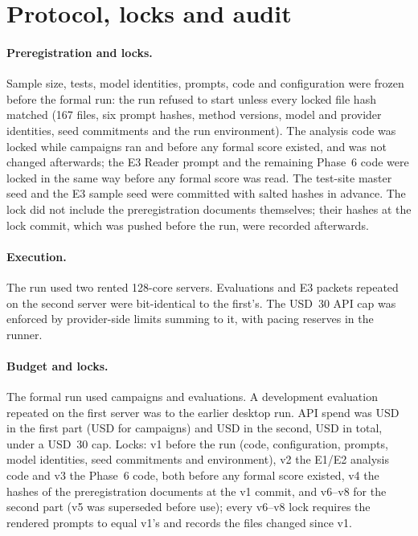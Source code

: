 \section{Protocol, locks and audit}
\label{app:protocol}
\paragraph{Preregistration and locks.} Sample size, tests, model identities, prompts, code and configuration were frozen before the formal run: the run refused to start unless every locked file hash matched (167 files, six prompt hashes, method versions, model and provider identities, seed commitments and the run environment). The analysis code was locked while campaigns ran and before any formal score existed, and was not changed afterwards; the E3 Reader prompt and the remaining Phase~6 code were locked in the same way before any formal score was read. The test-site master seed and the E3 sample seed were committed with salted hashes in advance. The lock did not include the preregistration documents themselves; their hashes at the lock commit, which was pushed before the run, were recorded afterwards.

\paragraph{Execution.} The run used two rented 128-core servers. Evaluations and E3 packets repeated on the second server were bit-identical to the first's. The USD~30 API cap was enforced by provider-side limits summing to it, with pacing reserves in the runner.

\paragraph{Budget and locks.} The formal run used  campaigns and  evaluations. A development evaluation repeated on the first server was  to the earlier desktop run. API spend was USD  in the first part (USD  for campaigns) and USD  in the second, USD  in total, under a USD~30 cap. Locks: v1 before the run (code, configuration, prompts, model identities, seed commitments and environment), v2 the E1/E2 analysis code and v3 the Phase~6 code, both before any formal score existed, v4 the hashes of the preregistration documents at the v1 commit, and v6--v8 for the second part (v5 was superseded before use); every v6--v8 lock requires the rendered prompts to equal v1's and records the files changed since v1.

